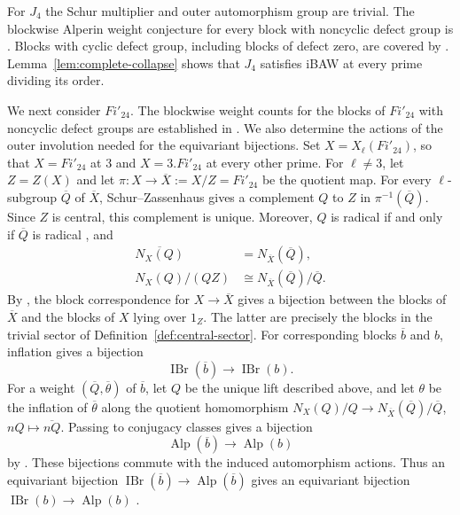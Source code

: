 \documentclass[10pt]{amsart}
\theoremstyle{definition}
\let\oldendproof\endproof
\renewenvironment{proof}[1][\proofname]{%
  \oldproof[\bfseries #1]%
}{\oldendproof}
\DeclareMathOperator{\IBr}{IBr}
\DeclareMathOperator{\Alp}{Alp}
\numberwithin{equation}{section}
\numberwithin{table}{section}
\begin{document}
\begin{proof}
For $J_4$ the Schur multiplier and outer automorphism group are trivial.
The blockwise Alperin weight conjecture for every block with noncyclic
defect group is \cite[Theorem~5.2]{AnOBrienWilsonJ4}.  Blocks with cyclic
defect group, including blocks of defect zero, are covered by
\cite[Proposition~6.2]{Spath2013}.  Lemma~\ref{lem:complete-collapse}
shows that $J_4$ satisfies iBAW at every prime dividing its order.

We next consider $Fi'_{24}$. The blockwise weight counts for the blocks of
$Fi'_{24}$ with noncyclic defect groups are established in
\cite[Theorem~4.3]{AnCannonOBrienUngerFi24}. We also determine the actions
of the outer involution needed for the equivariant bijections.
Set $X=X_\ell(Fi'_{24})$, so that
$X=Fi'_{24}$ at $3$ and $X=3.Fi'_{24}$ at every other prime.
For $\ell\ne3$, let $Z=Z(X)$ and let
$\pi:X\longrightarrow\overline X:=X/Z=Fi'_{24}$ be the quotient map.
For every $\ell$-subgroup $\overline Q$ of $\overline X$,
Schur--Zassenhaus gives a complement $Q$ to $Z$ in
$\pi^{-1}(\overline Q)$. Since $Z$ is central, this complement is
unique. Moreover, $Q$ is radical if and only if $\overline Q$ is radical
\cite[Lemma~2.3(c)]{NavarroTiep2011}, and
\begin{equation}\label{eq:fi24-central-quotient}
 \begin{aligned}
 \overline{N_X(Q)}&=N_{\overline X}(\overline Q),\\
 N_X(Q)/(QZ)&\cong N_{\overline X}(\overline Q)/\overline Q.
 \end{aligned}
\end{equation}
By \cite[Theorem~9.9(c)]{Navarro1998}, the block correspondence for
$X\longrightarrow\overline X$ gives a bijection between the blocks of
$\overline X$ and the blocks of $X$ lying over $1_Z$. The latter are
precisely the blocks in the trivial sector of
Definition~\ref{def:central-sector}.
For corresponding blocks $\overline b$ and $b$, inflation gives a bijection
\[
 \IBr(\overline b)\longrightarrow\IBr(b).
\]
For a weight $(\overline Q,\overline\theta)$ of $\overline b$, let $Q$
be the unique lift described above, and let $\theta$ be the inflation
of $\overline\theta$ along the quotient homomorphism
$N_X(Q)/Q\longrightarrow N_{\overline X}(\overline Q)/\overline Q$,
$nQ\longmapsto\overline{nQ}$.
Passing to conjugacy classes gives a bijection
\[
 \Alp(\overline b)\longrightarrow\Alp(b)
\]
by \cite[Lemma~2.3(iii)]{FengLiZhang2019}.
These bijections commute with the induced automorphism actions.
Thus an equivariant bijection $\IBr(\overline b)\to\Alp(\overline b)$
gives an equivariant bijection $\IBr(b)\to\Alp(b)$
\cite[Lemma~2.5]{FengLiZhang2019}.


\end{proof}
\end{document}
